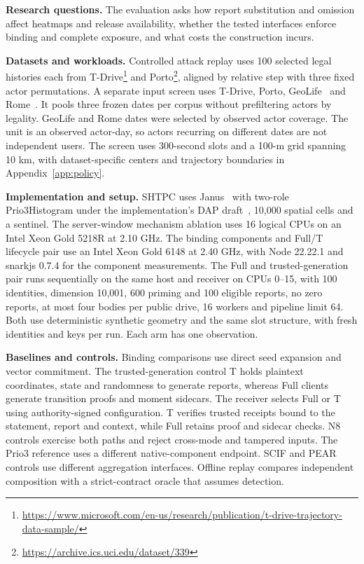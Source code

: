 \documentclass[conference,compsoc]{IEEEtran}
\theoremstyle{definition}
\numberwithin{equation}{section}
\numberwithin{table}{section}
\numberwithin{figure}{section}
\theoremstyle{plain}
\begin{document}
\textbf{Research questions.} The evaluation asks how report substitution and
omission affect heatmaps and release availability, whether the tested
interfaces enforce binding and complete exposure, and what costs the
construction incurs.

\textbf{Datasets and workloads.} Controlled attack replay uses 100 selected legal histories each from T-Drive\footnote{\url{https://www.microsoft.com/en-us/research/publication/t-drive-trajectory-data-sample/}} and Porto\footnote{\url{https://archive.ics.uci.edu/dataset/339}}, aligned by relative step with three fixed actor permutations. A separate input screen uses T-Drive, Porto, GeoLife~\cite{Zheng2010GeoLife} and Rome~\cite{Bracciale2014Rome}. It pools three frozen dates per corpus without prefiltering actors by legality. GeoLife and Rome dates were selected by observed actor coverage. The unit is an observed actor-day, so actors recurring on different dates are not independent users. The screen uses 300-second slots and a 100-m grid spanning 10 km, with dataset-specific centers and trajectory boundaries in Appendix~\ref{app:policy}.

\textbf{Implementation and setup.} SHTPC uses Janus~\cite{ISRGJanus} with two-role Prio3Histogram under the implementation's DAP draft~\cite{Geoghegan2023DAP09,Barnes2023VDAF08}, 10,000 spatial cells and a sentinel. The server-window mechanism ablation uses 16 logical CPUs on an Intel Xeon Gold 5218R at 2.10 GHz. The binding components and Full/T lifecycle pair use an Intel Xeon Gold 6148 at 2.40 GHz, with Node 22.22.1 and snarkjs 0.7.4 for the component measurements. The Full and trusted-generation pair runs sequentially on the same host and receiver on CPUs 0--15, with 100 identities, dimension 10,001, 600 priming and 100 eligible reports, no zero reports, at most four bodies per public drive, 16 workers and pipeline limit 64. Both use deterministic synthetic geometry and the same slot structure, with fresh identities and keys per run. Each arm has one observation.

\textbf{Baselines and controls.} Binding comparisons use direct seed expansion and vector commitment. The trusted-generation control T holds plaintext coordinates, state and randomness to generate reports, whereas Full clients generate transition proofs and moment sidecars. The receiver selects Full or T using authority-signed configuration. T verifies trusted receipts bound to the statement, report and context, while Full retains proof and sidecar checks. N8 controls exercise both paths and reject cross-mode and tampered inputs. The Prio3 reference uses a different native-component endpoint. SCIF and PEAR controls use different aggregation interfaces. Offline replay compares independent composition with a strict-contract oracle that assumes detection.
\end{document}
